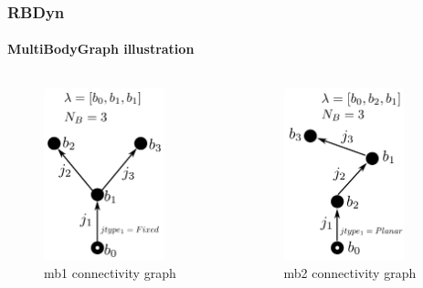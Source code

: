 \documentclass{beamer}
\begin{document}
  	\begin{frame}
		\frametitle{RBDyn}
		\framesubtitle{MultiBodyGraph illustration}
		\begin{columns}[T]
			\begin{column}[T]{5cm}
				\begin{figure}
					\includegraphics[height=5cm]{img/robot2_graph.pdf}
					\caption{mb1 connectivity graph}
				\end{figure}
			\end{column}
			\begin{column}[T]{5cm}
				\begin{figure}
					\includegraphics[height=5cm]{img/robot3_graph.pdf}
					\caption{mb2 connectivity graph}
				\end{figure}
			\end{column}
	     \end{columns}
	\end{frame}
\end{document}

